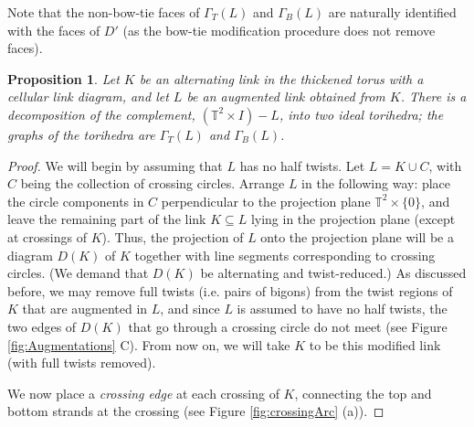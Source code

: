 \documentclass[11pt]{amsart}
\newcommand{\torus}{{\mathbb{T}^2}}
\theoremstyle{plain}
\newtheorem{prop}[theorem]{Proposition}
\theoremstyle{definition}
\begin{document}
Note that the non-bow-tie faces of $\Gamma_T(L)$ and $\Gamma_B(L)$
are naturally identified with the faces of $D'$
(as the bow-tie modification procedure does not remove faces).


\begin{prop}\label{p:tori_decomp}
Let $K$ be an alternating link in the thickened torus
with a cellular link diagram,
and let $L$ be an augmented link obtained from $K$.
There is a decomposition of the complement,
$(\torus \times I) - L$, into two ideal torihedra;
the graphs of the torihedra are $\Gamma_T(L)$ and $\Gamma_B(L)$.
\end{prop}


\begin{proof}



We will begin by assuming that $L$ has no half twists.
Let $L = K \cup C$, with $C$ being the collection of crossing circles.
Arrange $L$ in the following way:
place the circle components in $C$ perpendicular to
the projection plane $\torus \times \{0\}$,
and leave the remaining part of the link $K \subseteq L$
lying in the projection plane (except at crossings of $K$).
Thus, the projection of $L$ onto the projection plane
will be a diagram $D(K)$ of $K$
together with line segments corresponding to crossing circles.
(We demand that $D(K)$ be alternating and twist-reduced.)
As discussed before, we may remove full twists (i.e. pairs of bigons)
from the twist regions of $K$ that are augmented in $L$,
and since $L$ is assumed to have no half twists,
the two edges of $D(K)$ that go through a crossing circle
do not meet (see Figure \ref{fig:Augmentations} C).
From now on, we will take $K$ to be this modified link
(with full twists removed).


We now place a \emph{crossing edge} at each crossing of $K$,
connecting the top and bottom strands at the crossing
(see Figure \ref{fig:crossingArc} (a)).


\end{proof}
\end{document}
